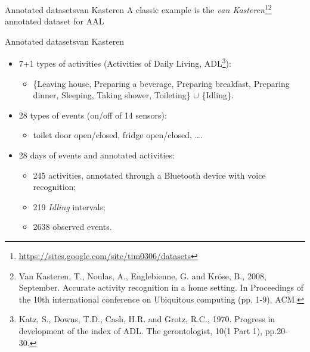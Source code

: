 \documentclass[9pt, handout]{beamer}
\begin{document}
      \begin{frame}{Annotated datasets}{van Kasteren}
        A classic example is the \textit{van Kasteren}\footnote{\url{https://sites.google.com/site/tim0306/datasets}}\footnote{Van Kasteren, T., Noulas, A., Englebienne, G. and Kröse, B., 2008, September. Accurate activity recognition in a home setting. In Proceedings of the 10th international conference on Ubiquitous computing (pp. 1-9). ACM.} annotated dataset for AAL
        
        \pause
      \end{frame}
      
      \begin{frame}{Annotated datasets}{van Kasteren}
        \pause
        \begin{itemize}
          \item 7+1 types of activities (Activities of Daily Living, ADL\footnote{Katz, S., Downs, T.D., Cash, H.R. and Grotz, R.C., 1970. Progress in development of the index of ADL. The gerontologist, 10(1 Part 1), pp.20-30.}):
          \begin{itemize}
            \item \{Leaving house, Preparing a beverage, Preparing breakfast, Preparing dinner, Sleeping, Taking shower, Toileting\} $\cup$ \{Idling\}.
          \end{itemize}
          \pause
          \item 28 types of events (on/off of 14 sensors):
          \begin{itemize}
            \item toilet door open/closed, fridge open/closed, \dots.
          \end{itemize}
          \pause
          \item 28 days of events and annotated activities:
          \begin{itemize}
            \item 245 activities, annotated through a Bluetooth device with voice recognition;
            \item 219 \textit{Idling} intervals;
            \item 2638 observed events.
          \end{itemize}
        \end{itemize}
      \end{frame}
      
\end{document}
